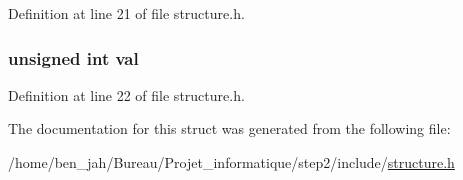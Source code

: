 \-Definition at line 21 of file structure.\-h.

\hypertarget{structregistre_a9163138d612480a614fa98c44e4318c4}{
\subsubsection[{val}]{\setlength{\rightskip}{0pt plus 5cm}unsigned int {\bf val}}}\label{structregistre_a9163138d612480a614fa98c44e4318c4}


\-Definition at line 22 of file structure.\-h.



\-The documentation for this struct was generated from the following file\-:\begin{DoxyCompactItemize}
\item 
/home/ben\-\_\-jah/\-Bureau/\-Projet\-\_\-informatique/step2/include/\hyperlink{structure_8h}{structure.\-h}\end{DoxyCompactItemize}
